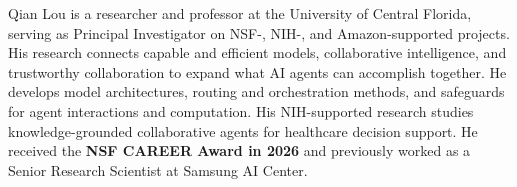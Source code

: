 Qian Lou is a researcher and professor at the University of Central Florida, serving as Principal Investigator on NSF-, NIH-, and Amazon-supported projects. His research connects capable and efficient models, collaborative intelligence, and trustworthy collaboration to expand what AI agents can accomplish together. He develops model architectures, routing and orchestration methods, and safeguards for agent interactions and computation. His NIH-supported research studies knowledge-grounded collaborative agents for healthcare decision support. He received the \textbf{NSF CAREER Award in 2026} and previously worked as a Senior Research Scientist at Samsung AI Center.
